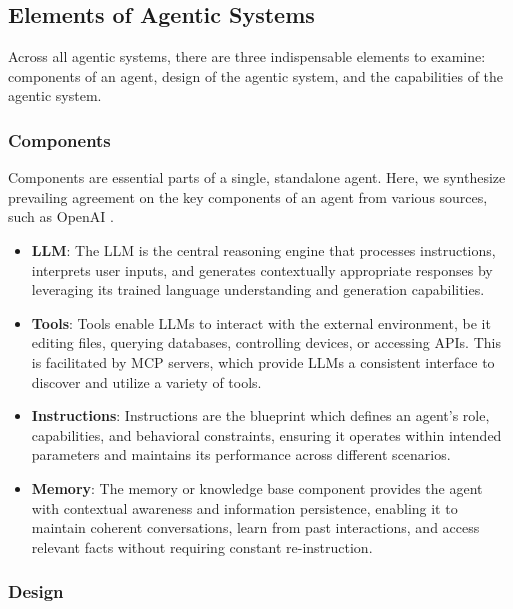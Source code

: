 \documentclass{article}
\begin{document}
\subsection{Elements of Agentic Systems}
\label{sec:elements}

Across all agentic systems, there are three indispensable elements to examine: components of an agent, design of the agentic system, and the capabilities of the agentic system.

\subsubsection{Components}
\label{sec:components}

Components are essential parts of a single, standalone agent. Here, we synthesize prevailing agreement on the key components of an agent from various sources, such as OpenAI \citep{openai2025_agents}.

\begin{itemize}

    \item \textbf{LLM}: The LLM is the central reasoning engine that processes instructions, interprets user inputs, and generates contextually appropriate responses by leveraging its trained language understanding and generation capabilities.

    \item \textbf{Tools}: Tools enable LLMs to interact with the external environment, be it editing files, querying databases, controlling devices, or accessing APIs. This is facilitated by MCP servers, which provide LLMs a consistent interface to discover and utilize a variety of tools.

    \item \textbf{Instructions}: Instructions are the blueprint which defines an agent's role, capabilities, and behavioral constraints, ensuring it operates within intended parameters and maintains its performance across different scenarios. 

    \item \textbf{Memory}: The memory or knowledge base component provides the agent with contextual awareness and information persistence, enabling it to maintain coherent conversations, learn from past interactions, and access relevant facts without requiring constant re-instruction.

\end{itemize}

\subsubsection{Design}
\label{sec:design}
\end{document}
